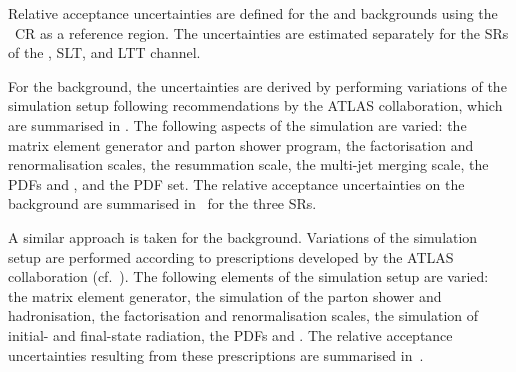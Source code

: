 


Relative acceptance uncertainties are defined for the \ZHF and \ttbar
backgrounds using the \ZHF~CR as a reference region. The uncertainties are
estimated separately for the SRs of the \hadhad, \lephad SLT, and \lephad LTT
channel.

For the \ZHF background, the uncertainties are derived by performing variations
of the simulation setup following recommendations by the ATLAS collaboration,
which are summarised in . The following aspects of
the simulation are varied: the matrix element generator and parton shower
program, the factorisation and renormalisation scales, the resummation scale,
the multi-jet merging scale, the PDFs and \alphas, and the PDF set. The relative
acceptance uncertainties on the \ZHF background are summarised
in~ for the three SRs.

A similar approach is taken for the \ttbar background. Variations of the
simulation setup are performed according to prescriptions developed by the ATLAS
collaboration (cf.~). The following elements of the
simulation setup are varied: the matrix element generator, the simulation of the
parton shower and hadronisation, the factorisation and renormalisation scales,
the simulation of initial- and final-state radiation, the PDFs and \alphas. The
relative acceptance uncertainties resulting from these prescriptions are
summarised in~.

